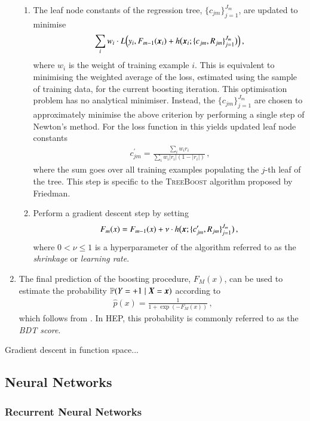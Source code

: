 \begin{enumerate}
\begin{enumerate}
  \item The leaf node constants of the regression tree,
    $\{c_{jm}\}_{j=1}^{J_{m}}$, are updated to minimise
    \begin{align*}
      \sum_i w_i \cdot
      L\mathopen{}\left( y_i, F_{m - 1}(\myvec{x}_i)
      + h\bigl( \myvec{x}_i; \{c_{jm}, R_{jm}\}_{j=1}^{J_{m}} \bigr)
      \right)\mathclose{}
      \,\text{,}
    \end{align*}
    where $w_i$ is the weight of training example $i$. This is equivalent to
    minimising the weighted average of the loss, estimated using the sample of
    training data, for the current boosting iteration. This optimisation problem
    has no analytical minimiser. Instead, the $\{c_{jm}\}_{j=1}^{J_{m}}$ are
    chosen to approximately minimise the above criterion by performing a single
    step of Newton's method. For the loss function in 
    this yields updated leaf node constants
    \begin{align*}
      c_{jm}^\prime = \frac{ \sum_i w_i r_i }{ \sum_i w_i |r_i| (1 - |r_i|)} \,\text{,}
    \end{align*}
    where the sum goes over all training examples populating the $j$-th leaf of
    the tree. This step is specific to the \textsc{TreeBoost} algorithm proposed
    by Friedman.

  \item Perform a gradient descent step by setting
    \begin{align*}
      F_m(x) = F_{m - 1}(x) + \nu \cdot h\bigl( \myvec{x}; \{c_{jm}^\prime, R_{jm}\}_{j=1}^{J_{m}} \bigr) \,\text{,}
    \end{align*}
    where $0 < \nu \leq 1$ is a hyperparameter of the algorithm referred to as
    the \emph{shrinkage} or \emph{learning rate}.
  \end{enumerate}

\item The final prediction of the boosting procedure, $F_{M}(x)$, can be used to
  estimate the probability $\mathbb{P}(Y = +1 \mid \myvec{X} = \myvec{x})$
  according to
  \begin{align*}
    \hat{p}(x) = \frac{1}{1 + \exp(-F_{M}(x))} \,\text{,}
  \end{align*}
  which follows from . In HEP, this probability is
  commonly referred to as the \emph{BDT score}.

\end{enumerate}

Gradient descent in function space...


\subsection{Neural Networks}%
\label{sec:neural_networks}

\subsubsection{Recurrent Neural Networks}%
\label{sec:rnn}


